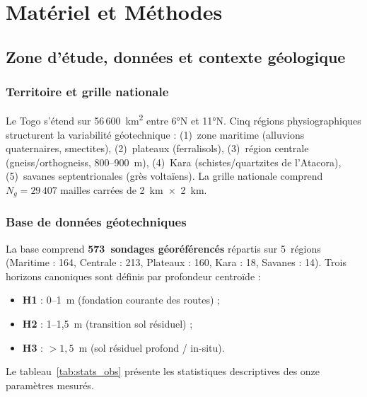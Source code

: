 \documentclass[10pt,a4paper,twocolumn]{article}
\begin{document}
\section{Matériel et Méthodes}
\label{sec:methodes}

\subsection{Zone d'étude, données et contexte géologique}
\label{sec:donnees}

\subsubsection{Territoire et grille nationale}

Le Togo s'étend sur 56\,600~km\textsuperscript{2} entre 6°N et 11°N.
Cinq régions physiographiques structurent la variabilité géotechnique :
(1)~zone maritime (alluvions quaternaires, smectites), (2)~plateaux
(ferralisols), (3)~région centrale (gneiss/orthogneiss, 800--900~m),
(4)~Kara (schistes/quartzites de l'Atacora), (5)~savanes septentrionales
(grès voltaïens). La grille nationale comprend $N_g = 29\,407$ mailles
carrées de 2~km~$\times$~2~km.

\subsubsection{Base de données géotechniques}

La base comprend \textbf{573~sondages géoréférencés} répartis sur
5~régions (Maritime : 164, Centrale : 213, Plateaux : 160, Kara : 18,
Savanes : 14). Trois horizons canoniques sont définis par profondeur
centroïde :

\begin{itemize}[noitemsep]
  \item \textbf{H1} : 0–1~m (fondation courante des routes) ;
  \item \textbf{H2} : 1–1{,}5~m (transition sol résiduel) ;
  \item \textbf{H3} : $>1{,}5$~m (sol résiduel profond / in-situ).
\end{itemize}

Le tableau~\ref{tab:stats_obs} présente les statistiques descriptives
des onze paramètres mesurés.
\end{document}
